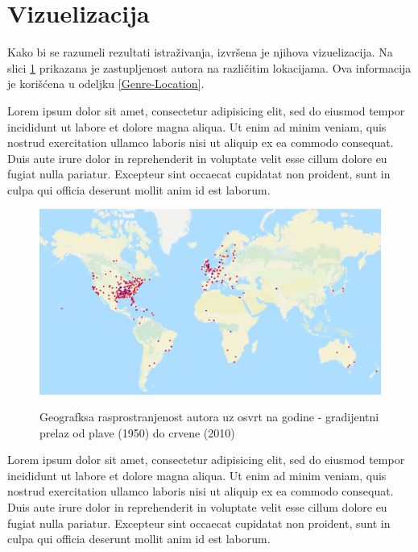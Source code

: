 \section{Vizuelizacija}
\label{sec:Vizuelizacija}
Kako bi se razumeli rezultati istra\v{z}ivanja, izvr\v{s}ena je njihova vizuelizacija. Na slici \ref{fig:Geolokacija} prikazana je zastupljenost autora na razli\v{c}itim lokacijama. Ova informacija je kori\v{s}\'c{}ena u odeljku \ref{Genre-Location}.

Lorem ipsum dolor sit amet, consectetur adipisicing elit, sed do eiusmod tempor incididunt ut labore et dolore magna aliqua. Ut enim ad minim veniam, quis nostrud exercitation ullamco laboris nisi ut aliquip ex ea commodo consequat. Duis aute irure dolor in reprehenderit in voluptate velit esse cillum dolore eu fugiat nulla pariatur. Excepteur sint occaecat cupidatat non proident, sunt in culpa qui officia deserunt mollit anim id est laborum.

\begin{figure}[H]
    \centering
    \includegraphics[scale=0.45]{resources/Geolokacija.png}
    \label{fig:Geolokacija}
    \caption{Geografksa rasprostranjenost autora uz osvrt na godine - gradijentni prelaz od plave (1950) do crvene (2010)}
\end{figure}

Lorem ipsum dolor sit amet, consectetur adipisicing elit, sed do eiusmod tempor incididunt ut labore et dolore magna aliqua. Ut enim ad minim veniam, quis nostrud exercitation ullamco laboris nisi ut aliquip ex ea commodo consequat. Duis aute irure dolor in reprehenderit in voluptate velit esse cillum dolore eu fugiat nulla pariatur. Excepteur sint occaecat cupidatat non proident, sunt in culpa qui officia deserunt mollit anim id est laborum.

